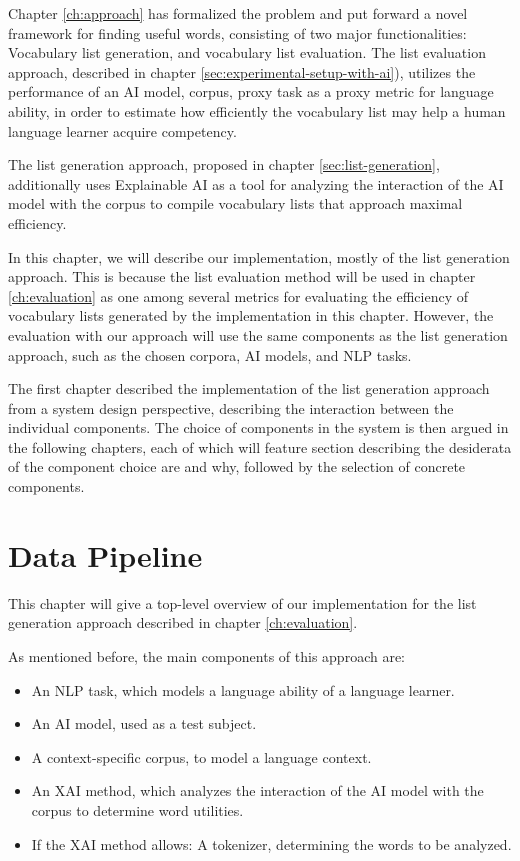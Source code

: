Chapter \ref{ch:approach} has formalized the problem and put forward a novel framework for finding useful words, consisting of two major functionalities:
Vocabulary list generation, and vocabulary list evaluation.
The list evaluation approach, described in chapter \ref{sec:experimental-setup-with-ai}), utilizes the performance of an AI model, corpus, proxy task as a proxy metric for language ability, in order to estimate how efficiently the vocabulary list may help a human language learner acquire competency.

The list generation approach, proposed in chapter \ref{sec:list-generation}, additionally uses Explainable AI as a tool for analyzing the interaction of the AI model with the corpus to compile vocabulary lists that approach maximal efficiency.

In this chapter, we will describe our implementation, mostly of the list generation approach.
This is because the list evaluation method will be used in chapter \ref{ch:evaluation} as one among several metrics for evaluating the efficiency of vocabulary lists generated by the implementation in this chapter.
However, the evaluation with our approach will use the same components as the list generation approach, such as the chosen corpora, AI models, and NLP tasks.

The first chapter described the implementation of the list generation approach from a system design perspective, describing the interaction between the individual components.
The choice of components in the system is then argued in the following chapters, each of which will feature section describing the desiderata of the component choice are and why, followed by the selection of concrete components.

\section{Data Pipeline}

This chapter will give a top-level overview of our implementation for the list generation approach described in chapter \ref{ch:evaluation}.

As mentioned before, the main components of this approach are:

\begin{itemize}
	\item An NLP task, which models a language ability of a language learner.
	\item An AI model, used as a test subject.
	\item A context-specific corpus, to model a language context.
	\item An XAI method, which analyzes the interaction of the AI model with the corpus to determine word utilities.
	\item If the XAI method allows: A tokenizer, determining the words to be analyzed.
\end{itemize}

